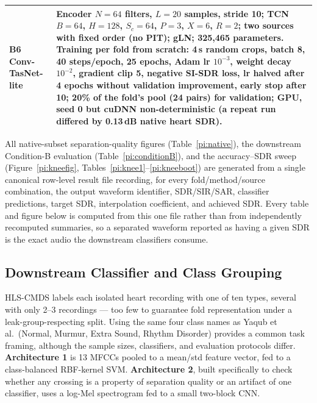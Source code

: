 \documentclass[journal]{IEEEtran}
\begin{document}
\begin{table}[t]
\begin{tabular}{@{}lp{15.2cm}@{}}
B6 Conv-TasNet-lite & Encoder $N{=}64$ filters, $L{=}20$ samples, stride 10; TCN $B{=}64$, $H{=}128$, $S_c{=}64$, $P{=}3$, $X{=}6$, $R{=}2$; two sources with fixed order (no PIT); gLN; 325{,}465 parameters. Training per fold from scratch: 4\,s random crops, batch 8, 40 steps/epoch, 25 epochs, Adam lr $10^{-3}$, weight decay $10^{-2}$, gradient clip 5, negative SI-SDR loss, lr halved after 4 epochs without validation improvement, early stop after 10; 20\% of the fold's pool (24 pairs) for validation; GPU, seed 0 but cuDNN non-deterministic (a repeat run differed by 0.13\,dB native heart SDR). \\
\bottomrule
\end{tabular}
\end{table}


All native-subset separation-quality figures (Table~\ref{pi:native}), the downstream Condition-B evaluation (Table~\ref{pi:conditionB}), and the accuracy--SDR sweep (Figure~\ref{pi:kneefig}, Tables~\ref{pi:knee1}--\ref{pi:kneeboot}) are generated from a single canonical row-level result file recording, for every fold/method/source combination, the output waveform identifier, SDR/SIR/SAR, classifier predictions, target SDR, interpolation coefficient, and achieved SDR. Every table and figure below is computed from this one file rather than from independently recomputed summaries, so a separated waveform reported as having a given SDR is the exact audio the downstream classifiers consume.

\subsection{Downstream Classifier and Class Grouping}

HLS-CMDS labels each isolated heart recording with one of ten types, several with only 2--3 recordings --- too few to guarantee fold representation under a leak-group-respecting split. Using the same four class names as Yaqub et al.\ (Normal, Murmur, Extra Sound, Rhythm Disorder) provides a common task framing, although the sample sizes, classifiers, and evaluation protocols differ. \textbf{Architecture 1} is 13 MFCCs pooled to a mean/std feature vector, fed to a class-balanced RBF-kernel SVM. \textbf{Architecture 2}, built specifically to check whether any crossing is a property of separation quality or an artifact of one classifier, uses a log-Mel spectrogram fed to a small two-block CNN.
\end{document}
